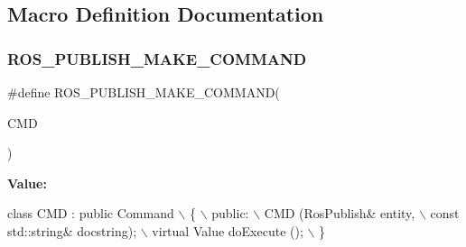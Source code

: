 \subsection{Macro Definition Documentation}
\mbox{\label{ros__publish_8hh_a9201180ce4ec1ca81883161ab4506350}} 
\subsubsection{\texorpdfstring{R\+O\+S\+\_\+\+P\+U\+B\+L\+I\+S\+H\+\_\+\+M\+A\+K\+E\+\_\+\+C\+O\+M\+M\+A\+ND}{ROS\_PUBLISH\_MAKE\_COMMAND}}
{\footnotesize\ttfamily \#define R\+O\+S\+\_\+\+P\+U\+B\+L\+I\+S\+H\+\_\+\+M\+A\+K\+E\+\_\+\+C\+O\+M\+M\+A\+ND(\begin{DoxyParamCaption}\item[{}]{C\+MD }\end{DoxyParamCaption})}

{\bfseries Value\+:}
\begin{DoxyCode}
\textcolor{keyword}{class }CMD : \textcolor{keyword}{public} Command          \(\backslash\)
      \{                         \(\backslash\)
      public:                       \(\backslash\)
    CMD (RosPublish& entity,                \(\backslash\)
         \textcolor{keyword}{const} std::string& docstring);     \(\backslash\)
    virtual Value doExecute ();         \(\backslash\)
      \}
\end{DoxyCode}
